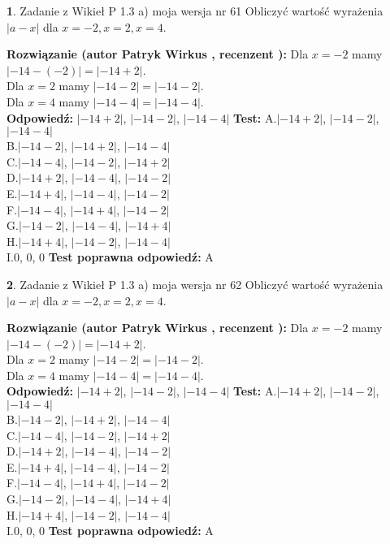 \documentclass[12pt, a4paper]{article}
\theoremstyle{definition} %
\newtheorem{zad}{}
\newcommand{\zadStart}[1]{\begin{zad}#1\newline}
\newcommand{\zadStop}{\end{zad}}
\newcommand{\rozwStart}[2]{\noindent \textbf{Rozwiązanie (autor #1 , recenzent #2): }\newline}
\newcommand{\rozwStop}{\newline}
\newcommand{\odpStart}{\noindent \textbf{Odpowiedź:}\newline}
\newcommand{\odpStop}{\newline}
\newcommand{\testStart}{\noindent \textbf{Test:}\newline}
\newcommand{\testStop}{\newline}
\newcommand{\kluczStart}{\noindent \textbf{Test poprawna odpowiedź:}\newline}
\newcommand{\kluczStop}{\newline}
\begin{document}
\zadStart{Zadanie z Wikieł P 1.3 a) moja wersja nr 61}
Obliczyć wartość wyrażenia $|a - x|$ dla $x=-2,x=2,x=4$.
\zadStop
\rozwStart{Patryk Wirkus}{}
Dla $x = -2$ mamy $|-14 - (-2)| = |-14 + 2|$.\\
Dla $x = 2$ mamy $|-14 - 2| = |-14 - 2|$.\\
Dla $x = 4$ mamy $|-14 - 4| = |-14 - 4|$.\\
\rozwStop
\odpStart
$|-14 + 2|$, $|-14 - 2|$, $|-14 - 4|$
\odpStop
\testStart
A.$|-14 + 2|$, $|-14 - 2|$, $|-14 - 4|$\\
B.$|-14 - 2|$, $|-14 + 2|$, $|-14 - 4|$\\
C.$|-14 - 4|$, $|-14 - 2|$, $|-14 + 2|$\\
D.$|-14 + 2|$, $|-14 - 4|$, $|-14 - 2|$\\
E.$|-14 + 4|$, $|-14 - 4|$, $|-14 - 2|$\\
F.$|-14 - 4|$, $|-14 + 4|$, $|-14 - 2|$\\
G.$|-14 - 2|$, $|-14 - 4|$, $|-14 + 4|$\\
H.$|-14 + 4|$, $|-14 - 2|$, $|-14 - 4|$\\
I.$0$, $0$, $0$
\testStop
\kluczStart
A
\kluczStop



\zadStart{Zadanie z Wikieł P 1.3 a) moja wersja nr 62}
Obliczyć wartość wyrażenia $|a - x|$ dla $x=-2,x=2,x=4$.
\zadStop
\rozwStart{Patryk Wirkus}{}
Dla $x = -2$ mamy $|-14 - (-2)| = |-14 + 2|$.\\
Dla $x = 2$ mamy $|-14 - 2| = |-14 - 2|$.\\
Dla $x = 4$ mamy $|-14 - 4| = |-14 - 4|$.\\
\rozwStop
\odpStart
$|-14 + 2|$, $|-14 - 2|$, $|-14 - 4|$
\odpStop
\testStart
A.$|-14 + 2|$, $|-14 - 2|$, $|-14 - 4|$\\
B.$|-14 - 2|$, $|-14 + 2|$, $|-14 - 4|$\\
C.$|-14 - 4|$, $|-14 - 2|$, $|-14 + 2|$\\
D.$|-14 + 2|$, $|-14 - 4|$, $|-14 - 2|$\\
E.$|-14 + 4|$, $|-14 - 4|$, $|-14 - 2|$\\
F.$|-14 - 4|$, $|-14 + 4|$, $|-14 - 2|$\\
G.$|-14 - 2|$, $|-14 - 4|$, $|-14 + 4|$\\
H.$|-14 + 4|$, $|-14 - 2|$, $|-14 - 4|$\\
I.$0$, $0$, $0$
\testStop
\kluczStart
A
\kluczStop
\end{document}
